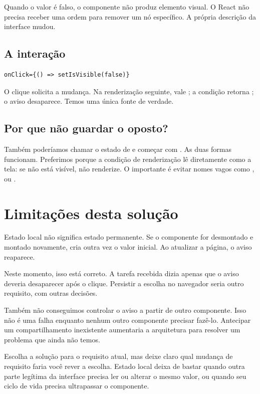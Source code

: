 Quando o valor é falso, o componente não produz elemento visual. O React não
precisa receber uma ordem para remover um nó específico. A própria descrição da
interface mudou.

\subsection{A interação}

\begin{lstlisting}
onClick={() => setIsVisible(false)}
\end{lstlisting}

O clique solicita a mudança. Na renderização seguinte,  vale
; a condição retorna ; o aviso desaparece. Temos uma
única fonte de verdade.

\subsection{Por que não guardar o oposto?}

Também poderíamos chamar o estado de  e começar com
. As duas formas funcionam. Preferimos  porque a
condição de renderização lê diretamente como a tela: se não está visível, não
renderize. O importante é evitar nomes vagos como ,
 ou .

\section{Limitações desta solução}

Estado local não significa estado permanente. Se o componente for desmontado e
montado novamente,  cria outra vez o valor inicial. Ao
atualizar a página, o aviso reaparece.

Neste momento, isso está correto. A tarefa recebida dizia apenas que o aviso
deveria desaparecer após o clique. Persistir a escolha no navegador seria outro
requisito, com outras decisões.

Também não conseguimos controlar o aviso a partir de outro componente. Isso não
é uma falha enquanto nenhum outro componente precisar fazê-lo. Antecipar um
compartilhamento inexistente aumentaria a arquitetura para resolver um problema
que ainda não temos.

\begin{decisao}
Escolha a solução para o requisito atual, mas deixe claro qual mudança de
requisito faria você rever a escolha. Estado local deixa de bastar quando outra
parte legítima da interface precisa ler ou alterar o mesmo valor, ou quando seu
ciclo de vida precisa ultrapassar o componente.
\end{decisao}

